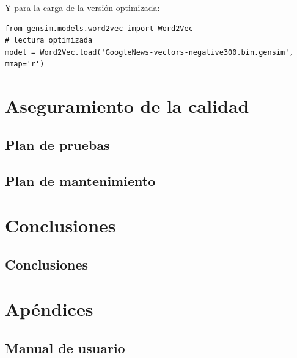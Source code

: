 Y para la carga de la versión optimizada:

\begin{verbatim}
from gensim.models.word2vec import Word2Vec
# lectura optimizada
model = Word2Vec.load('GoogleNews-vectors-negative300.bin.gensim', mmap='r')
\end{verbatim}


\part{Aseguramiento de la calidad}

\chapter{Plan de pruebas}

\chapter{Plan de mantenimiento}

\part{Conclusiones}

\chapter{Conclusiones}

\part{Apéndices}
\appendix

\chapter{Manual de usuario}


